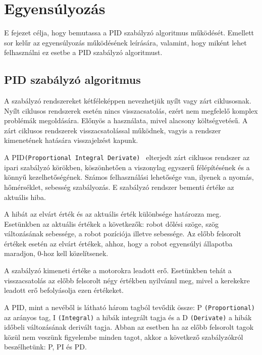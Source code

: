 \chapter{Egyensúlyozás}\label{ch:EGYENSULY}
\begin{osszefoglal}
E fejezet célja, hogy bemutassa a PID szabályzó algoritmus működését. Emellett sor kelűr az egyensúlyozás működésének leírására, valamint, hogy miként lehet felhasználni ez esetbe a PID szabályzó algoritmust.
\end{osszefoglal}

\section{PID szabályzó algoritmus}\label{sec:EGYENSULY:pid}

A szabályzó rendszereket kétféleképpen nevezhetjük nyílt vagy zárt ciklusosnak.  Nyílt ciklusos rendszerek esetén nincs visszacsatolás, ezért nem megfelelő komplex problémák megoldására. Előnyös a használata, mivel alacsony költségvetésű. A zárt ciklusos rendszerek visszacsatolással működnek, vagyis a rendszer kimenetének hatására visszajelzést kapunk.

A PID\texttt{(Proportional Integral Derivate)}~\cite{pid} elterjedt zárt ciklusos rendszer az ipari szabályzó körökben, köszönhetően a viszonylag egyszerű félépítésének és a könnyű kezelhetőségének. Számos felhasználási lehetősége van, ilyenek a nyomás, hőmérséklet, sebesség szabályozás. E szabályzó rendszer bementi értéke az aktuális hiba.

A hibát az elvárt érték és az aktuális érték különbsége határozza meg. Esetünkben az aktuális értékek a következők: robot dőlési szöge, szög változásának sebessége, a robot pozíciója illetve sebessége. Az előbb felsorolt értékek esetén az elvárt értékek, ahhoz, hogy a robot egyensúlyi állapotba maradjon, 0-hoz kell közelítsenek.

A szabályzó kimeneti értéke a motorokra leadott erő. Esetünkben tehát a visszacsatolás az előbb felsorolt négy értékben nyilvánul meg, mivel a kerekekre leadott erő befolyásolja ezen értékeket.

A PID, mint a nevéből is látható három tagból tevődik össze: P \texttt{(Proportional)} az arányos tag, I \texttt{(Integral)} a hibák integrált tagja és a D \texttt{(Derivate)} a hibák időbeli változásának derivált tagja. Abban az esetben ha az előbb felsorolt tagok közül nem veszünk figyelembe minden tagot, akkor a következő szabályzókról beszélhetünk: P, PI és PD.

